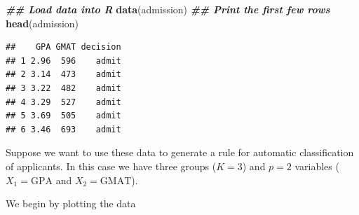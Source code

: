 \documentclass[
]{article}
\newenvironment{Shaded}{\begin{snugshade}}{\end{snugshade}}
\newcommand{\AttributeTok}[1]{\textcolor[rgb]{0.13,0.29,0.53}{#1}}
\newcommand{\DecValTok}[1]{\textcolor[rgb]{0.00,0.00,0.81}{#1}}
\newcommand{\DocumentationTok}[1]{\textcolor[rgb]{0.56,0.35,0.01}{\textbf{\textit{#1}}}}
\newcommand{\FunctionTok}[1]{\textcolor[rgb]{0.13,0.29,0.53}{\textbf{#1}}}
\newcommand{\NormalTok}[1]{#1}
\newcommand{\SpecialCharTok}[1]{\textcolor[rgb]{0.81,0.36,0.00}{\textbf{#1}}}
\newcommand{\StringTok}[1]{\textcolor[rgb]{0.31,0.60,0.02}{#1}}
\begin{document}
\begin{Shaded}
\begin{Highlighting}[]
\DocumentationTok{\#\# Load data into R}
\FunctionTok{data}\NormalTok{(admission)}
\DocumentationTok{\#\# Print the first few rows}
\FunctionTok{head}\NormalTok{(admission)}
\end{Highlighting}
\end{Shaded}

\begin{verbatim}
##    GPA GMAT decision
## 1 2.96  596    admit
## 2 3.14  473    admit
## 3 3.22  482    admit
## 4 3.29  527    admit
## 5 3.69  505    admit
## 6 3.46  693    admit
\end{verbatim}

Suppose we want to use these data to generate a rule for automatic
classification of applicants. In this case we have three groups
(\(K=3\)) and \(p=2\) variables (\(X_1 = \text{GPA}\) and
\(X_2 = \text{GMAT}\)).

We begin by plotting the data

\begin{Shaded}
\end{Shaded}
\end{document}
